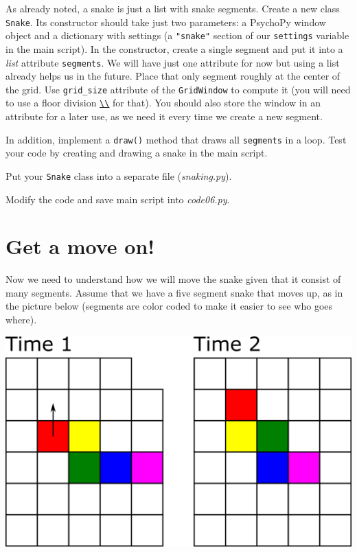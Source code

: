 \documentclass[
]{book}
\begin{document}
As already noted, a snake is just a list with snake segments. Create a new class \texttt{Snake}. Its constructor should take just two parameters: a PsychoPy window object and a dictionary with settings (a \texttt{"snake"} section of our \texttt{settings} variable in the main script). In the constructor, create a single segment and put it into a \emph{list} attribute \texttt{segments}. We will have just one attribute for now but using a list already helps us in the future. Place that only segment roughly at the center of the grid. Use \texttt{grid\_size} attribute of the \texttt{GridWindow} to compute it (you will need to use a floor division \href{https://docs.python.org/3/library/operator.html\#mapping-operators-to-functions}{\texttt{\textbackslash{}\textbackslash{}}} for that). You should also store the window in an attribute for a later use, as we need it every time we create a new segment.

In addition, implement a \texttt{draw()} method that draws all \texttt{segments} in a loop. Test your code by creating and drawing a snake in the main script.

Put your \texttt{Snake} class into a separate file (\emph{snaking.py}).

Modify the code and save main script into \emph{code06.py}.

\hypertarget{get-a-move-on}{%
\section{Get a move on!}\label{get-a-move-on}}

Now we need to understand how we will move the snake given that it consist of many segments. Assume that we have a five segment snake that moves up, as in the picture below (segments are color coded to make it easier to see who goes where).

\includegraphics[width=14.36in]{images/snake-movement}
\end{document}
